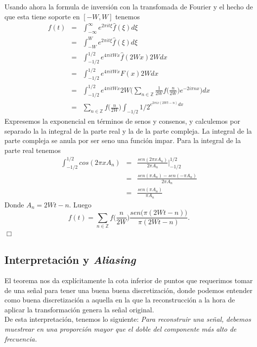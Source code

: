 \documentclass[a4paper]{article}
\begin{document}
Usando ahora la formula de inversi\'on
con la transfomada de Fourier y el hecho de que esta tiene soporte en $[-W,W]$ tenemos
\begin{eqnarray*}
 f(t)
 &=& \int_{-\infty}^{\infty}{e^{2\pi i t \xi} \hat{f}(\xi) d\xi}\\
 &=& \int_{-W}^{W}{e^{2\pi i t \xi} \hat{f}(\xi) d\xi}\\
 &=& \int_{-1/2}^{1/2}{e^{4\pi i t W x} \hat{f}(2Wx) 2W dx}\\
 &=& \int_{-1/2}^{1/2}{e^{4\pi i t W x} F(x) 2W dx}\\
 &=& \int_{-1/2}^{1/2}{ e^{4\pi i t W x} 2W  \Big( 
 \sum_{n\in\mathbb{Z}}{ \frac{1}{2W} f\big(\frac{n}{2W}\big) e^{-2i\pi n x} }
 \Big)dx}\\
 &=& \sum_{n\in\mathbb{Z}}{  f\Big(\frac{n}{2W}\Big)
      \int_{-1/2}{1/2}^{ e^{2\pi i x(2Wt-n)} dx } }
\end{eqnarray*}
Expresemos la exponencial en t\'erminos de senos y consenos, y calculemos por separado la la integral
de la parte real y la de la parte compleja. La integral de la parte compleja se anula por ser seno
una funci\'on impar. Para la integral de la parte real tenemos
\begin{eqnarray*}
  \int_{-1/2}^{1/2}{cos(2\pi x A_n)}
  &=&\frac{sen(2\pi x A_n)}{2\pi A_n}\Big|_{-1/2}^{1/2}\\
  &=&\frac{sen(\pi A_n)-sen(-\pi A_n)}{2\pi A_n}\\
  &=& \frac{sen(\pi A_n)}{\pi A_n}
\end{eqnarray*}
Donde $A_n=2Wt-n$. Luego 
\begin{equation*}
 f(t)=\sum_{n\in\mathbb{Z}}{  f\Big(\frac{n}{2W}\Big) \frac{sen\big(\pi(2Wt-n)\big)}{\pi(2Wt-n)} }. 
\end{equation*}
$\Box$

\subsection{\sffamily Interpretación y \textit{Aliasing}}
El teorema nos da explícitamente la cota inferior de puntos que requerimos tomar de una señal para tener una buena buena discretización, donde podemos entender como buena discretización a aquella en la que la reconstrucción a la hora de aplicar la transformación genera la señal original.\\

\noindent De esta interpretación, tenemos lo siguiente: \textit{Para reconstruir una señal, debemos muestrear en una proporción mayor que el doble del componente más alto de frecuencia.}\\
\end{document}
